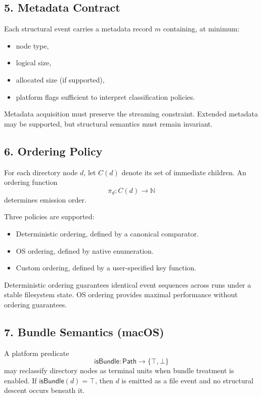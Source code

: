 \subsection*{5. Metadata Contract}

Each structural event carries a metadata record $m$ containing, at minimum:
\begin{itemize}
    \item node type,
    \item logical size,
    \item allocated size (if supported),
    \item platform flags sufficient to interpret classification policies.
\end{itemize}

Metadata acquisition must preserve the streaming constraint. 
Extended metadata may be supported, but structural semantics must remain invariant.

\subsection*{6. Ordering Policy}

For each directory node $d$, let $C(d)$ denote its set of immediate children. 
An ordering function
\[
\pi_d : C(d) \to \mathbb{N}
\]
determines emission order.

Three policies are supported:
\begin{itemize}
    \item Deterministic ordering, defined by a canonical comparator.
    \item OS ordering, defined by native enumeration.
    \item Custom ordering, defined by a user-specified key function.
\end{itemize}

Deterministic ordering guarantees identical event sequences across runs 
under a stable filesystem state. OS ordering provides maximal performance 
without ordering guarantees.

\subsection*{7. Bundle Semantics (macOS)}

A platform predicate
\[
\mathsf{isBundle} : \mathsf{Path} \to \{\top, \bot\}
\]
may reclassify directory nodes as terminal units when bundle treatment is enabled. 
If $\mathsf{isBundle}(d) = \top$, then $d$ is emitted as a file event and 
no structural descent occurs beneath it.

